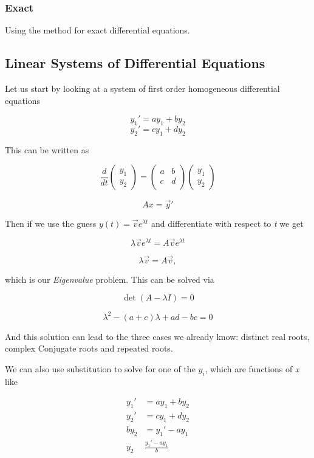 \subsubsection{Exact}

Using the method for exact differential equations.

\subsection{Linear Systems of Differential Equations}

Let us start by looking at a system of first order homogeneous differential equations

\[
    y_1 ' = ay_1 + by_2
\]
\[
    y_2 ' = cy_1 + dy_2
\]

This can be written as 

\[
    \frac{d}{dt} 
    \begin{pmatrix} 
    y_1 \\ 
    y_2 
    \end{pmatrix} 
    = 
    \begin{pmatrix}
    a & b \\
    c & d \\
    \end{pmatrix} 
    \begin{pmatrix}
    y_1 \\ 
    y_2
    \end{pmatrix}
\]

\[
    Ax = \vec{y}'
\]

Then if we use the guess \(y(t) = \vec{v} e^{\lambda t}\) and differentiate with respect to \emph{t} 
we get 

\[
    \lambda \vec{v} e^{\lambda t} = A \vec{v} e^{\lambda t}
\]

\[
    \lambda \vec{v} = A \vec{v},
\]

which is our \emph{Eigenvalue} problem. This can be solved via

\[
    \det(A - \lambda I) = 0
\]

\[
    \lambda^{2} - (a + c)\lambda + ad - bc = 0
\]

And this solution can lead to the three cases we already know: distinct real roots, complex Conjugate 
roots and repeated roots.
\vspace{\baselineskip}

We can also use substitution to solve for one of the \(y_i\), which are functions of \emph{x} like

\begin{align*}
    y_1 ' &= ay_1 + by_2\\
    y_2 ' &= cy_1 + dy_2\\
    by_2 &= y_1' - ay_1\\
    y_2 & \frac{y_1' - ay_1}{b}
\end{align*}


